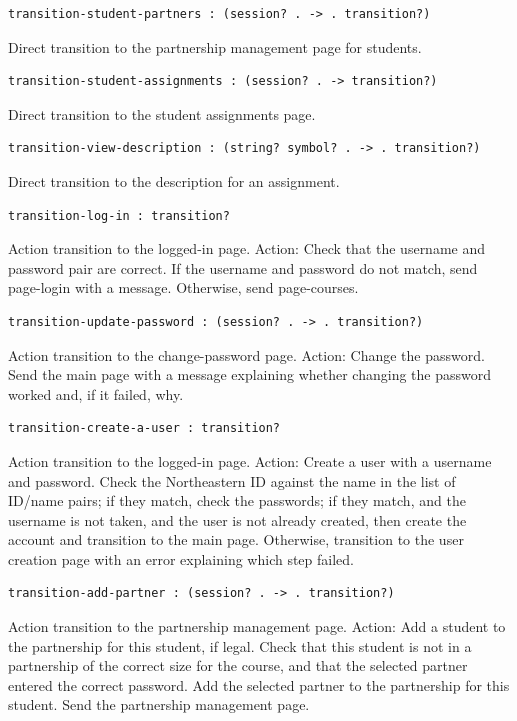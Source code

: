 \documentclass[a4paper]{article}
\begin{document}
\begin{verbatim}
transition-student-partners : (session? . -> . transition?)
\end{verbatim}
Direct transition to the partnership management page for students.

\begin{verbatim}
transition-student-assignments : (session? . -> transition?)
\end{verbatim}
Direct transition to the student assignments page.

\begin{verbatim}
transition-view-description : (string? symbol? . -> . transition?)
\end{verbatim}
Direct transition to the description for an assignment.

\begin{verbatim}
transition-log-in : transition?
\end{verbatim}
Action transition to the logged-in page.
Action: Check that the username and password pair are correct.
If the username and password do not match, send page-login with a message.
Otherwise, send page-courses.

\begin{verbatim}
transition-update-password : (session? . -> . transition?)
\end{verbatim}
Action transition to the change-password page.
Action: Change the password.
Send the main page with a message explaining whether changing the password
worked and, if it failed, why.

\begin{verbatim}
transition-create-a-user : transition?
\end{verbatim}
Action transition to the logged-in page.
Action: Create a user with a username and password.
Check the Northeastern ID against the name in the list of
ID/name pairs; if they match, check the passwords; if they
match, and the username is not taken, and the user is not
already created, then create the account and transition to
the main page. Otherwise, transition to the user
creation page with an error explaining which step failed.

\begin{verbatim}
transition-add-partner : (session? . -> . transition?)
\end{verbatim}
Action transition to the partnership management page.
Action: Add a student to the partnership for this student, if legal.
Check that this student is not in a partnership of the correct size for the
course, and that the selected partner entered the correct password. Add
the selected partner to the partnership for this student. Send the partnership
management page.
\end{document}
